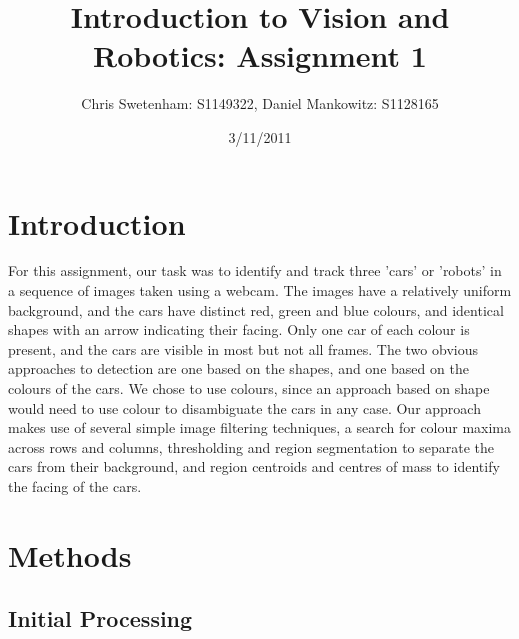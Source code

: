 \documentclass{article}
\title{Introduction to Vision and Robotics: Assignment 1}
\author{Chris Swetenham: S1149322, Daniel Mankowitz: S1128165}
\date{3/11/2011}
\begin{document}
\maketitle

\section{Introduction}
\label{sec:introduction}
For this assignment, our task was to identify and track three 'cars' or 'robots' in a sequence of images taken using a webcam. The images have a relatively uniform background, and the cars have distinct red, green and blue colours, and identical shapes with an arrow indicating their facing. Only one car of each colour is present, and the cars are visible in most but not all frames.
The two obvious approaches to detection are one based on the shapes, and one based on the colours of the cars. We chose to use colours, since an approach based on shape would need to use colour to disambiguate the cars in any case.
Our approach makes use of several simple image filtering techniques, a search for colour maxima across rows and columns, thresholding and region segmentation to separate the cars from their background, and region centroids and centres of mass to identify the facing of the cars.

\section{Methods}
\label{sec:methods}





\subsection{Initial Processing}
\label{sec:processing}
\end{document}
